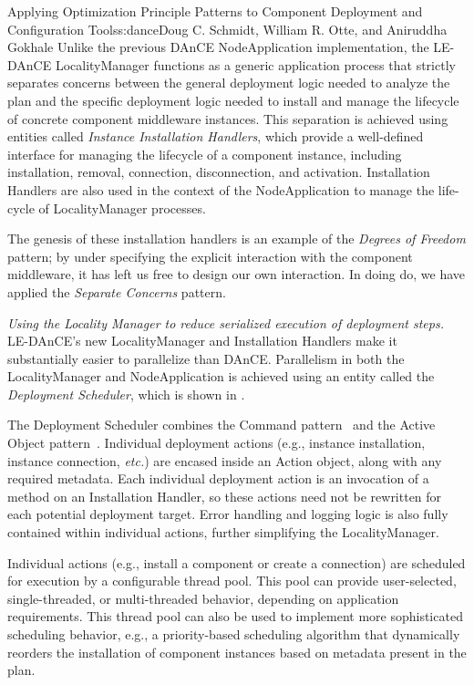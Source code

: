 \begin{aosachapter}{Applying Optimization Principle Patterns to Component Deployment and
                    Configuration Tools}{s:dance}{Doug C. Schmidt, William R. Otte, and Aniruddha Gokhale}
Unlike the previous DAnCE NodeApplication implementation, the LE-DAnCE
LocalityManager functions as a generic application process that strictly
separates concerns between the general deployment logic needed to
analyze the plan and the specific deployment logic needed to install and
manage the lifecycle of concrete component middleware instances. This
separation is achieved using entities called \emph{Instance Installation
Handlers}, which provide a well-defined interface for managing the
lifecycle of a component instance, including installation, removal,
connection, disconnection, and activation. Installation Handlers are
also used in the context of the NodeApplication to manage the life-cycle
of LocalityManager processes.

The genesis of these installation handlers is an example of the
\emph{Degrees of Freedom} pattern; by under specifying the explicit
interaction with the component middleware, it has left us free to design
our own interaction. In doing do, we have applied the \emph{Separate
Concerns} pattern.

\emph{Using the Locality Manager to reduce serialized execution of
deployment steps.} LE-DAnCE's new LocalityManager and Installation
Handlers make it substantially easier to parallelize than DAnCE.
Parallelism in both the LocalityManager and NodeApplication is achieved
using an entity called the \emph{Deployment Scheduler}, which is shown
in .


The Deployment Scheduler combines the Command
pattern~\cite{Vlissides:94} and the Active Object
pattern~\cite{Schmidt:00a}. Individual deployment actions (e.g.,
instance installation, instance connection, \emph{etc.}) are encased
inside an Action object, along with any required metadata. Each
individual deployment action is an invocation of a method on an
Installation Handler, so these actions need not be rewritten for each
potential deployment target. Error handling and logging logic is also
fully contained within individual actions, further simplifying the
LocalityManager.

Individual actions (e.g., install a component or create a connection)
are scheduled for execution by a configurable thread pool. This pool can
provide user-selected, single-threaded, or multi-threaded behavior,
depending on application requirements. This thread pool can also be used
to implement more sophisticated scheduling behavior, e.g., a
priority-based scheduling algorithm that dynamically reorders the
installation of component instances based on metadata present in the
plan.


\end{aosachapter}
